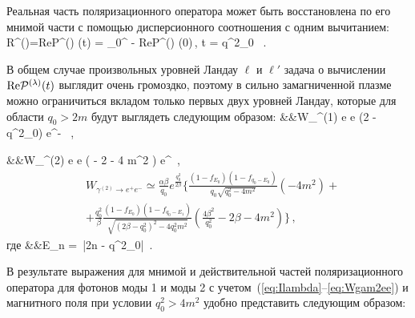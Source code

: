 Реальная часть 
поляризационного оператора может быть восстановлена по его мнимой части с помощью дисперсионного соотношения с одним 
вычитанием:
%
\beq 
R^{(\lambda)}=\textrm{Re}{\cal P}^{(\lambda)} (t) = \int \limits_0^\infty {} - \textrm{Re}{\cal P}^{(\lambda)} (0)\,, \qquad  t = q^2_0 \, .
\label{eq:Disp}
\eeq

В общем случае произвольных уровней Ландау $\ell$ и $\ell'$ задача о вычислении $\textrm{Re} {\cal P}^{(\lambda)}(t)$ выглядит очень громоздко, поэтому в сильно замагниченной плазме можно ограничиться вкладом только первых двух уровней Ландау, которые для области $q_0>2m$ будут выглядеть следующим образом:
\beq
&&W_{\gamma^{(1)} e \to e} \simeq {}
{} (2 \beta - q^{2}_{0}) e^{-}   \, ,
\eeq
%

\beq
\label{eq:wabs2} 
&&W_{\gamma^{(2)} e \to e} \simeq
{} 
{}
\left ( - 2 \beta - 4 m^2 \right )
 e^{}\, ,
\eeq
\begin{equation}\label{eq:Wgam2ee}
	\begin{aligned}
			&W_{\gamma^{(2)} \to e^+e^-} \simeq\frac{\alpha \beta}{q_0}e^{\frac{q_0^2}{2\beta}} \bigg\{
		\frac{(1-f_{E_{0}}) (1 - f_{q_0 - E_{0}})}{q_0\sqrt{q^{2}_{0}-4 m^2}}
		\left (- 4 m^2 \right )+
		\\
		& 
		+
		\frac{q_0^2}{\beta}
		\frac{(1-f_{E_{0}}) (1 - f_{q_0 - E_{1}})}{\sqrt{(2\beta-q^{2}_{0})^2-4 q^{2}_{0}m^2}} 
		\left (\frac{4\beta^2}{q^{2}_{0}} - 2 \beta - 4 m^2 \right ) 
		 \bigg\} \, ,
	\end{aligned}
\end{equation}
где
\beq
\nonumber
&&E_{n} =  \,\left|2\beta n - q^2_{0}\right |\, .
\eeq

В результате выражения для мнимой и действительной частей поляризационного оператора для фотонов моды 1 и моды 2 с учетом~(\ref{eq:Ilambda}--\ref{eq:Wgam2ee}) и магнитного поля при условии $q_0^2>4m^2$ удобно представить следующим образом:

